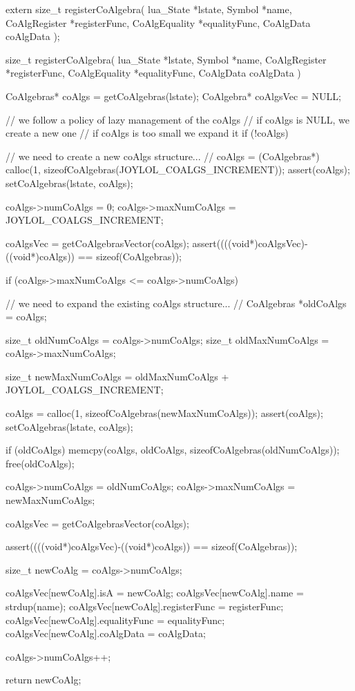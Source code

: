 extern size_t registerCoAlgebra(
  lua_State     *lstate,
  Symbol        *name,
  CoAlgRegister *registerFunc,
  CoAlgEquality *equalityFunc,
  CoAlgData      coAlgData
);
\stopCHeader

\startCCode
size_t registerCoAlgebra(
  lua_State     *lstate,
  Symbol        *name,
  CoAlgRegister *registerFunc,
  CoAlgEquality *equalityFunc,
  CoAlgData     coAlgData
) {
  CoAlgebras* coAlgs    = getCoAlgebras(lstate);
  CoAlgebra*  coAlgsVec = NULL;

  // we follow a policy of lazy management of the coAlgs
  // if coAlgs is NULL, we create a new one
  // if coAlgs is too small we expand it
  if (!coAlgs) {
    // we need to create a new coAlgs structure...
    //
    coAlgs = (CoAlgebras*)
      calloc(1, sizeofCoAlgebras(JOYLOL_COALGS_INCREMENT));
    assert(coAlgs);
    setCoAlgebras(lstate, coAlgs);
    
    coAlgs->numCoAlgs    = 0;
    coAlgs->maxNumCoAlgs = JOYLOL_COALGS_INCREMENT;
  }
  coAlgsVec = getCoAlgebrasVector(coAlgs);
  assert((((void*)coAlgsVec)-((void*)coAlgs)) == sizeof(CoAlgebras));

  if (coAlgs->maxNumCoAlgs <= coAlgs->numCoAlgs) {
    // we need to expand the existing coAlgs structure...
    //  
    CoAlgebras *oldCoAlgs  = coAlgs;
    
    size_t oldNumCoAlgs    = coAlgs->numCoAlgs;
    size_t oldMaxNumCoAlgs = coAlgs->maxNumCoAlgs;
    
    size_t newMaxNumCoAlgs =
      oldMaxNumCoAlgs + JOYLOL_COALGS_INCREMENT;

    coAlgs = calloc(1, sizeofCoAlgebras(newMaxNumCoAlgs));
    assert(coAlgs);
    setCoAlgebras(lstate, coAlgs);
    
    if (oldCoAlgs) {
      memcpy(coAlgs, oldCoAlgs,
        sizeofCoAlgebras(oldNumCoAlgs));
      free(oldCoAlgs);
    }
    
    coAlgs->numCoAlgs    = oldNumCoAlgs;
    coAlgs->maxNumCoAlgs = newMaxNumCoAlgs;

    coAlgsVec = getCoAlgebrasVector(coAlgs);
  }
  assert((((void*)coAlgsVec)-((void*)coAlgs)) == sizeof(CoAlgebras));
  
  size_t newCoAlg = coAlgs->numCoAlgs;
  
  coAlgsVec[newCoAlg].isA           = newCoAlg;
  coAlgsVec[newCoAlg].name          = strdup(name);
  coAlgsVec[newCoAlg].registerFunc  = registerFunc;
  coAlgsVec[newCoAlg].equalityFunc  = equalityFunc;
  coAlgsVec[newCoAlg].coAlgData     = coAlgData;
  
  coAlgs->numCoAlgs++;
  
  return newCoAlg;
}
\stopCCode

